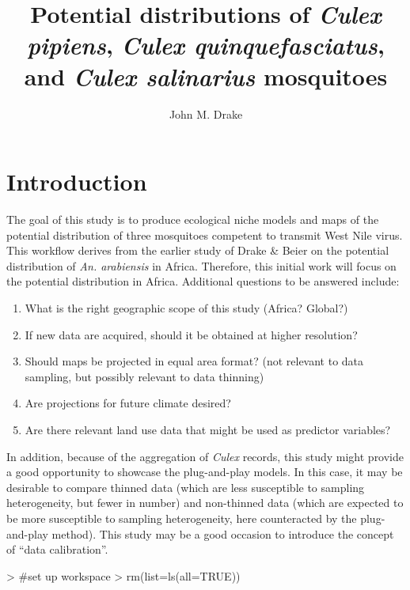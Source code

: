 \documentclass[10pt]{article}
\title{Potential distributions of \emph{Culex pipiens}, \emph{Culex quinquefasciatus}, and \emph{Culex salinarius} mosquitoes}
\author{John M. Drake}
\renewenvironment{Schunk}{\vspace{\topsep}}{\vspace{\topsep}}
\begin{document}


\maketitle
  
\section{Introduction}
  
The goal of this study is to produce ecological niche models and maps of the potential distribution of three mosquitoes competent to transmit West Nile virus. This workflow derives from the earlier study of Drake \& Beier on the potential distribution of \textit{An. arabiensis} in Africa. Therefore, this initial work will focus on the potential distribution in Africa. Additional questions to be answered include:

\begin{enumerate}
  \item What is the right geographic scope of this study (Africa? Global?)
  \item If new data are acquired, should it be obtained at higher resolution?
  \item Should maps be projected in equal area format? (not relevant to data sampling, but possibly relevant to data thinning)
  \item Are projections for future climate desired?
  \item Are there relevant land use data that might be used as predictor variables?
\end{enumerate}

In addition, because of the aggregation of \textit{Culex} records, this study might provide a good opportunity to showcase the plug-and-play models. In this case, it may be desirable to compare thinned data (which are less susceptible to sampling heterogeneity, but fewer in number) and non-thinned data (which are expected to be more susceptible to sampling heterogeneity, here counteracted by the plug-and-play method). This study may be a good occasion to introduce the concept of ``data calibration''.


  
\begin{Schunk}
\begin{Sinput}
> #set up workspace
> rm(list=ls(all=TRUE))
\end{Sinput}
\end{Schunk}
  
\end{document}
